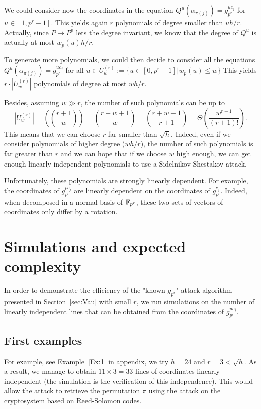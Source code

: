 \documentclass[a4paper]{article}
\begin{document}
We could consider now the coordinates in the equation $Q^u(\alpha_{\pi(j)}) = g_{p^r}^{u c_j}$ for $u \in [1,p^r-1]$. This yields again $r$ polynomials of degree smaller than $u h/r$. Actually, since $P \mapsto P^p$ lets the degree invariant, we know that the degree of $Q^u$ is actually at most $w_p(u) h / r$.

To generate more polynomials, we could then decide to consider all the equations $Q^u(\alpha_{\pi(j)}) = g_{p^r}^{u c_j}$ for all $u \in U_w^{(r)} := \{ u \in [0,p^r-1] | w_p(u) \leq w \}$
This yields $r \cdot |U_w^{(r)}|$ polynomials of degree at most $wh/r$.

Besides, assuming $w \gg r$, the number of such polynomials can be up to
$$ | U_w^{(r)} | = \left( \binom{r+1}{w} \right) = \binom{r+w+1}{w} = \binom{r+w+1}{r+1} = \Theta\left(\frac{w^{r+1}}{(r+1)!}\right) .$$
This means that we can choose $r$ far smaller than $\sqrt{h}$. Indeed, even if we consider polynomials of higher degree ($wh/r$), the number of such polynomials is far greater than $r$ and we can hope that if we choose $w$ high enough, we can get enough linearly independent polynomials to use a Sidelnikov-Shestakov attack.


Unfortunately, these polynomials are strongly linearly dependent.
For example, the coordinates of $g_{p^r}^{p c_j}$ are linearly dependent on the coordinates of $g_{p^r}^{c_j}$. Indeed, when decomposed in a normal basis of $\mathbb{F}_{p^r}$, these two sets of vectors of coordinates only differ by a rotation.



\section{Simulations and expected complexity}
\label{sec:Simul}


In order to demonstrate the efficiency of the "known $g_{p^r}$" attack algorithm presented in Section~\ref{sec:Vau} with small $r$, we run simulations on the number of linearly independent lines that can be obtained from the coordinates of $g_{p^r}^{uc_j}$.


\subsection{First examples}

For example, see Example~\ref{Ex:1} in appendix, we try $h = 24$ and $r = 3 < \sqrt{h}$. As a result, we manage to obtain $11 \times 3 = 33$ lines of coordinates linearly independent (the simulation is the verification of this independence). This would allow the attack to retrieve the permutation $\pi$ using the attack on the cryptosystem based on Reed-Solomon codes.
\end{document}
